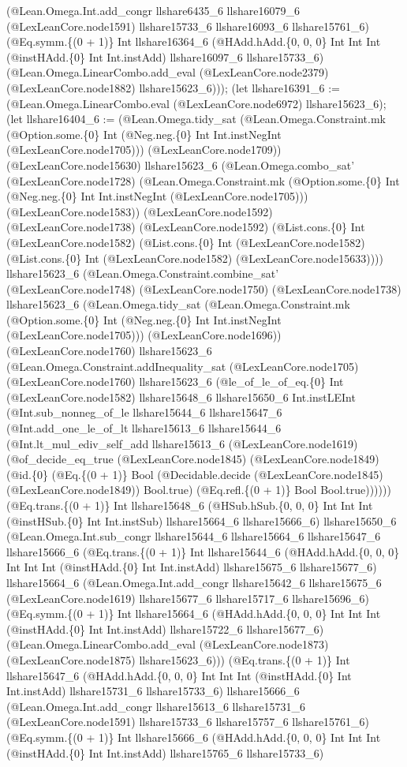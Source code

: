 \documentclass[11pt]{article}
\begin{document}
(@Lean.Omega.Int.add\_congr llshare6435\_6 llshare16079\_6 (@LexLeanCore.node1591) llshare15733\_6 llshare16093\_6 llshare15761\_6) (@Eq.symm.\{(0 + 1)\} Int llshare16364\_6 (@HAdd.hAdd.\{0, 0, 0\} Int Int Int (@instHAdd.\{0\} Int Int.instAdd) llshare16097\_6 llshare15733\_6) (@Lean.Omega.LinearCombo.add\_eval (@LexLeanCore.node2379) (@LexLeanCore.node1882) llshare15623\_6))); (let llshare16391\_6 := (@Lean.Omega.LinearCombo.eval (@LexLeanCore.node6972) llshare15623\_6); (let llshare16404\_6 := (@Lean.Omega.tidy\_sat (@Lean.Omega.Constraint.mk (@Option.some.\{0\} Int (@Neg.neg.\{0\} Int Int.instNegInt (@LexLeanCore.node1705))) (@LexLeanCore.node1709)) (@LexLeanCore.node15630) llshare15623\_6 (@Lean.Omega.combo\_sat' (@LexLeanCore.node1728) (@Lean.Omega.Constraint.mk (@Option.some.\{0\} Int (@Neg.neg.\{0\} Int Int.instNegInt (@LexLeanCore.node1705))) (@LexLeanCore.node1583)) (@LexLeanCore.node1592) (@LexLeanCore.node1738) (@LexLeanCore.node1592) (@List.cons.\{0\} Int (@LexLeanCore.node1582) (@List.cons.\{0\} Int (@LexLeanCore.node1582) (@List.cons.\{0\} Int (@LexLeanCore.node1582) (@LexLeanCore.node15633)))) llshare15623\_6 (@Lean.Omega.Constraint.combine\_sat' (@LexLeanCore.node1748) (@LexLeanCore.node1750) (@LexLeanCore.node1738) llshare15623\_6 (@Lean.Omega.tidy\_sat (@Lean.Omega.Constraint.mk (@Option.some.\{0\} Int (@Neg.neg.\{0\} Int Int.instNegInt (@LexLeanCore.node1705))) (@LexLeanCore.node1696)) (@LexLeanCore.node1760) llshare15623\_6 (@Lean.Omega.Constraint.addInequality\_sat (@LexLeanCore.node1705) (@LexLeanCore.node1760) llshare15623\_6 (@le\_of\_le\_of\_eq.\{0\} Int (@LexLeanCore.node1582) llshare15648\_6 llshare15650\_6 Int.instLEInt (@Int.sub\_nonneg\_of\_le llshare15644\_6 llshare15647\_6 (@Int.add\_one\_le\_of\_lt llshare15613\_6 llshare15644\_6 (@Int.lt\_mul\_ediv\_self\_add llshare15613\_6 (@LexLeanCore.node1619) (@of\_decide\_eq\_true (@LexLeanCore.node1845) (@LexLeanCore.node1849) (@id.\{0\} (@Eq.\{(0 + 1)\} Bool (@Decidable.decide (@LexLeanCore.node1845) (@LexLeanCore.node1849)) Bool.true) (@Eq.refl.\{(0 + 1)\} Bool Bool.true)))))) (@Eq.trans.\{(0 + 1)\} Int llshare15648\_6 (@HSub.hSub.\{0, 0, 0\} Int Int Int (@instHSub.\{0\} Int Int.instSub) llshare15664\_6 llshare15666\_6) llshare15650\_6 (@Lean.Omega.Int.sub\_congr llshare15644\_6 llshare15664\_6 llshare15647\_6 llshare15666\_6 (@Eq.trans.\{(0 + 1)\} Int llshare15644\_6 (@HAdd.hAdd.\{0, 0, 0\} Int Int Int (@instHAdd.\{0\} Int Int.instAdd) llshare15675\_6 llshare15677\_6) llshare15664\_6 (@Lean.Omega.Int.add\_congr llshare15642\_6 llshare15675\_6 (@LexLeanCore.node1619) llshare15677\_6 llshare15717\_6 llshare15696\_6) (@Eq.symm.\{(0 + 1)\} Int llshare15664\_6 (@HAdd.hAdd.\{0, 0, 0\} Int Int Int (@instHAdd.\{0\} Int Int.instAdd) llshare15722\_6 llshare15677\_6) (@Lean.Omega.LinearCombo.add\_eval (@LexLeanCore.node1873) (@LexLeanCore.node1875) llshare15623\_6))) (@Eq.trans.\{(0 + 1)\} Int llshare15647\_6 (@HAdd.hAdd.\{0, 0, 0\} Int Int Int (@instHAdd.\{0\} Int Int.instAdd) llshare15731\_6 llshare15733\_6) llshare15666\_6 (@Lean.Omega.Int.add\_congr llshare15613\_6 llshare15731\_6 (@LexLeanCore.node1591) llshare15733\_6 llshare15757\_6 llshare15761\_6) (@Eq.symm.\{(0 + 1)\} Int llshare15666\_6 (@HAdd.hAdd.\{0, 0, 0\} Int Int Int (@instHAdd.\{0\} Int Int.instAdd) llshare15765\_6 llshare15733\_6) 
\end{document}
